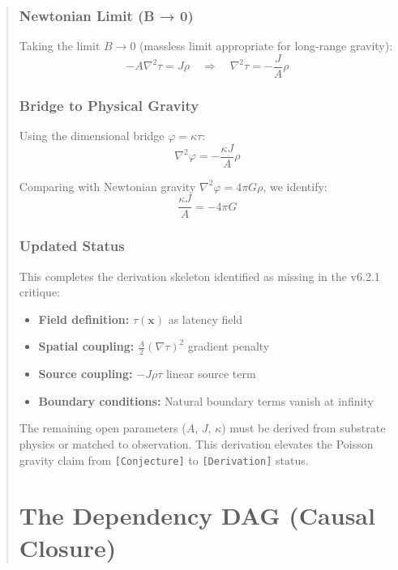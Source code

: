 \documentclass[11pt,titlepage]{article}
\begin{document}
\begin{abstract}
\subsubsection{Newtonian Limit (B → 0)}
Taking the limit $B \to 0$ (massless limit appropriate for long-range gravity):
\begin{equation}
-A\nabla^2\tau = J\rho \quad\Rightarrow\quad \nabla^2\tau = -\frac{J}{A}\rho
\end{equation}

\subsubsection{Bridge to Physical Gravity}
Using the dimensional bridge $\varphi = \kappa\tau$:
\begin{equation}
\nabla^2\varphi = -\frac{\kappa J}{A}\rho
\end{equation}

Comparing with Newtonian gravity $\nabla^2\varphi = 4\pi G\rho$, we identify:
\begin{equation}
\frac{\kappa J}{A} = -4\pi G
\end{equation}

\subsubsection{Updated Status}
This completes the derivation skeleton identified as missing in the v6.2.1 critique:
\begin{itemize}
    \item \textbf{Field definition:} $\tau(\mathbf{x})$ as latency field
    \item \textbf{Spatial coupling:} $\frac{A}{2}(\nabla\tau)^2$ gradient penalty
    \item \textbf{Source coupling:} $-J\rho\tau$ linear source term
    \item \textbf{Boundary conditions:} Natural boundary terms vanish at infinity
\end{itemize}

The remaining open parameters ($A$, $J$, $\kappa$) must be derived from substrate physics or matched to observation. This derivation elevates the Poisson gravity claim from \texttt{[Conjecture]} to \texttt{[Derivation]} status.
\section{The Dependency DAG (Causal Closure)}
\begin{center}
\end{center}
\end{abstract}
\end{document}
